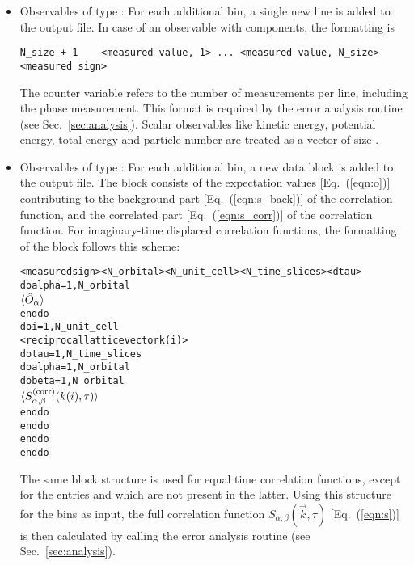 \begin{itemize}
\item Observables of type :
For each additional bin, a single new line is added to the output file.
In case of an observable with  components, the formatting is 
\begin{verbatim}
N_size + 1    <measured value, 1> ... <measured value, N_size>    <measured sign>
\end{verbatim}
The counter variable  refers to the number of measurements per line, including the phase measurement. 
This format is required by the error analysis routine (see Sec.~\ref{sec:analysis}). 
Scalar observables like kinetic energy, potential energy, total energy and particle number are treated as a vector 
of size .

\item Observables of type :
For each additional bin, a new data block is added to the output file. 
The block consists of the expectation values [Eq.~(\ref{eqn:o})] contributing to the background part [Eq.~(\ref{eqn:s_back})] of the correlation function,
and the correlated part [Eq.~(\ref{eqn:s_corr})] of the correlation function.
For imaginary-time displaced correlation functions, the formatting of the block follows this scheme:
\begin{alltt}
<measured sign>  <N_orbital>  <N_unit_cell> <N_time_slices> <dtau>
do alpha = 1, N_orbital
    \(\langle\hat{O}\sb{\alpha}\rangle \)
enddo
do i = 1, N_unit_cell
   <reciprocal lattice vector k(i)>
   do tau = 1, N_time_slices
      do alpha = 1, N_orbital
         do beta = 1, N_orbital
            \(\langle{S}\sb{\alpha,\beta}\sp{(\mathrm{corr})}(k(i),\tau)\rangle\)
         enddo
      enddo
   enddo
enddo
\end{alltt}
The same block structure is used for equal time correlation functions, except for the entries   and  
which are not present in the latter.
Using this structure for the bins as input,
the full correlation function $S_{\alpha,\beta}(\vec{k},\tau)$ [Eq.~(\ref{eqn:s})] is then calculated by calling the error analysis routine (see Sec.~\ref{sec:analysis}).
\end{itemize}

%

